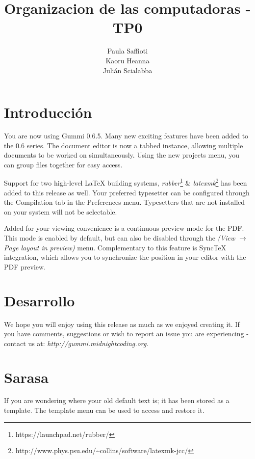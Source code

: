 \documentclass[11pt]{article}
\title{\textbf{Organizacion de las computadoras - TP0 }}
\author{Paula Saffioti\\
		Kaoru Heanna\\
		Juli\'an Scialabba}
\date{}
\begin{document}
\maketitle

\section{Introducci\'on}

You are now using Gummi 0.6.5. Many new exciting features have been added to the 0.6 series. The document editor is now a tabbed instance, allowing multiple documents to be worked on simultaneously. Using the new projects menu, you can group files together for easy access. 

Support for two high-level {\LaTeX} building systems, \emph{rubber}\footnote{https://launchpad.net/rubber/} \& \emph{latexmk}\footnote{http://www.phys.psu.edu/{\textasciitilde}collins/software/latexmk-jcc/} has been added to this release as well. Your preferred typesetter can be configured through the Compilation tab in the Preferences menu. Typesetters that are not installed on your system will not be selectable. 

Added for your viewing convenience is a continuous preview mode for the PDF. This mode is enabled by default, but can also be disabled through the \emph{(View $\rightarrow$ Page layout in preview)} menu. Complementary to this feature is SyncTeX integration, which allows you to synchronize the position in your editor with the PDF preview. 

\section{Desarrollo}
We hope you will enjoy using this release as much as we enjoyed creating it. If you have comments, suggestions or wish to report an issue you are experiencing - contact us at: \emph{http://gummi.midnightcoding.org}.

\section{Sarasa}
If you are wondering where your old default text is; it has been stored as a template. The template menu can be used to access and restore it. 
\end{document}
